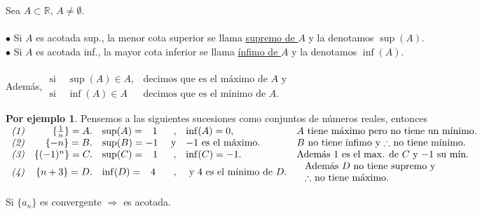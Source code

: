 \documentclass{article}
\theoremstyle{definition}
\theoremstyle{definition}
\newtheorem*{ej}{Por ejemplo}
\theoremstyle{remark}
\newcommand\R{\ensuremath{\mathbb{R}}}
\begin{document}
\begin{defi}
  Sea $A \subset \R $, $A\neq \emptyset $. \; \\ \\
  $\bullet$ \; Si $A$ es acotada sup., la menor cota superior se llama \underline{supremo de $A$} y la denotamos $\sup(A)$. \\
  $\bullet$ \; Si $A$ es acotada inf., la mayor cota inferior se llama \underline{ínfimo de $A$} y la denotamos $\inf(A)$. \\ \\
Además, 
$\begin{array}{lcl}
  \text{si } & \sup(A) \in A, & \text{decimos que es el máximo de $A$ y} \\
  \text{si } & \inf(A) \in A & \text{decimos que es el mínimo de $A$}.  
  \end{array}$
\end{defi}
\pagebreak
\begin{ej}
Pensemos a las siguientes sucesiones como conjuntos de números reales, entonces \\
$ \begin{array}{lrlrll}
  \emph{(1)} & \{\frac{1}{n}\}=A. & \sup(A)=\phantom{-}1 & , &\inf(A)=0,   &  A \text{ tiene máximo pero no tiene un mínimo.} \\
\emph{(2)} & \{-n\}=B.          & \sup(B)=-1 & \text{ y} & \text{$-1$ es el máximo.} &  \text{$B$ no tiene ínfimo y $\therefore$ no tiene mínimo.} \\
\emph{(3)} & \{(-1)^n\}=C.      & \sup(C)=\phantom{-}1 &,&\inf(C)=-1.             & \text{Además $1$ es el max. de $C$ y $-1$ su mín.} \\
\emph{(4)} & \{n+3\}=D.         & \inf(D)=\phantom{-}4 &,&    \text{ y $4$ es el mínimo de $D$.} & \begin{array}{l}
  \text{ Además $D$ no tiene supremo y} \\
  \text{ $\therefore$ no tiene máximo.}        
  \end{array}
  \end{array}$
\end {ej}


\begin{teo}
  Si $\{a_n\}$ es convergente $\Rightarrow$ es acotada.
\end{teo}
\end{document}

